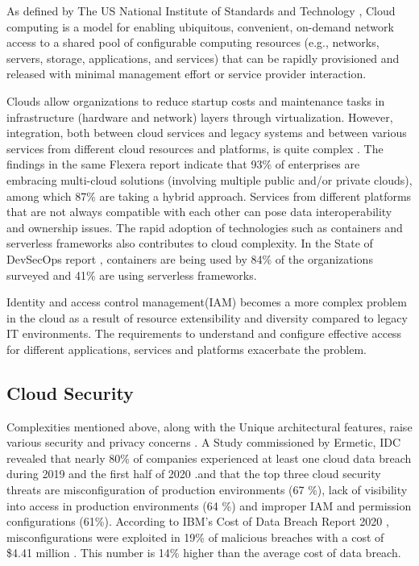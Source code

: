\documentclass[sigconf]{acmart}
\begin{document}
As defined by The US National Institute of Standards and Technology \cite{NIST2016},
Cloud computing is a model for enabling ubiquitous, convenient, on-demand network access to a shared pool of configurable computing resources (e.g., networks, servers, storage, applications, and services) that can be rapidly provisioned and released with minimal management effort or service provider interaction.

Clouds allow organizations to reduce startup costs and maintenance tasks in infrastructure (hardware and network) layers through virtualization. However, integration, both between cloud services and legacy systems and between various services from different cloud resources and platforms, is quite complex \cite{Baron2019}. 
The findings in the same Flexera report \cite{Flexera2020} indicate that 93\% of enterprises are embracing multi-cloud solutions (involving multiple public and/or private clouds), among which 87\% are taking a hybrid approach. Services from different platforms that are not always compatible with each other can pose data interoperability and ownership issues.
The rapid adoption of technologies such as containers and serverless frameworks also contributes to cloud complexity. In the State of DevSecOps report \cite{Sharrm} , containers are being used by 84\% of the organizations surveyed and 41\% are using serverless frameworks.

Identity and access control management(IAM) becomes a more complex problem in the cloud as a result of resource extensibility and diversity compared to legacy IT environments. The requirements to understand and configure effective access for different applications, services and platforms exacerbate the problem.



\subsection{Cloud Security}
Complexities mentioned above, along with the Unique architectural features, raise various security and privacy concerns \cite{Takabi2010}. A Study \cite{Ermetic2020} commissioned by Ermetic, IDC revealed that nearly 80\% of companies experienced at least one cloud data breach during 2019 and the first half of 2020 .and that the top three cloud security threats are misconfiguration of production environments (67 \%), lack of visibility into access in production environments (64 \%) and improper IAM and permission configurations (61\%). According to IBM's Cost of Data Breach Report 2020 \cite{IBMSecurity2020}, misconfigurations were exploited in 19\% of malicious breaches with a cost of \$4.41 million . This number is 14\% higher than the average cost of data breach.
\end{document}
